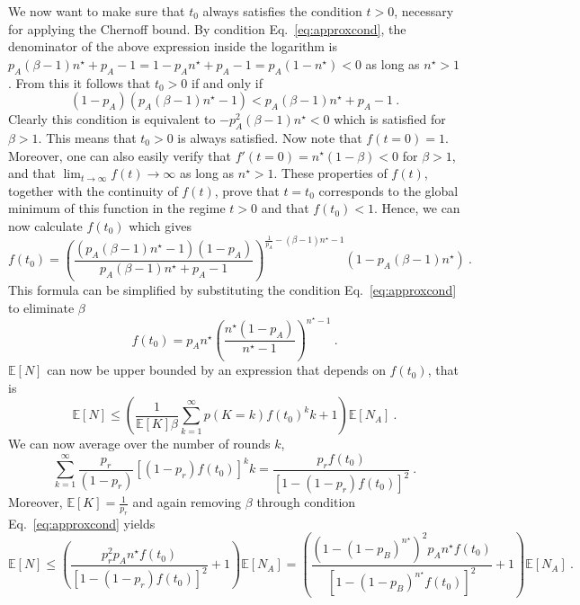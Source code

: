 \documentclass[aps,pra,reprint,superscriptaddress]{revtex4-1}
\newcommand{\nstar}{n^{\star}}
\begin{document}
We now want to make sure that $t_0$ always satisfies the condition $t>0$, necessary for applying the Chernoff bound. By condition Eq.~\eqref{eq:approxcond}, the denominator of the above expression inside the logarithm is $p_A (\beta-1)\nstar + p_A - 1 = 1- p_A\nstar + p_A - 1 = p_A (1-\nstar) <0$ as long as $\nstar >1$. From this it follows that $t_0>0$ if and only if
\begin{equation}
(1-p_A) (p_A (\beta-1)\nstar - 1) < p_A (\beta-1)\nstar + p_A - 1\ .
\end{equation}
Clearly this condition is equivalent to $-p_A^2 (\beta-1)\nstar
<0$ which is satisfied for $\beta>1$. This means that $t_0>0$ is
always satisfied. Now note that $f(t=0) = 1$. Moreover, one can also
easily verify that $f'(t=0) = \nstar (1-\beta) < 0$ for $\beta >1$, and that $\lim_{t \rightarrow \infty} f(t) \rightarrow \infty$ as long as $\nstar>1$. These properties of $f(t)$, together with the continuity of $f(t)$, prove that $t=t_0$ corresponds to the global minimum of this function in the regime $t>0$ and that $f(t_0) <1$. Hence, we can now calculate $f(t_0)$ which gives
\begin{equation}
f(t_0) = \left(\frac{(p_A (\beta-1)\nstar-1)(1-p_A)}{p_A(\beta-1)\nstar+p_A-1}\right)^{\frac{1}{p_A} -  (\beta-1)\nstar - 1} (1 - p_A (\beta-1)\nstar)\ .
\end{equation}
This formula can be simplified by substituting the condition Eq.~\eqref{eq:approxcond} to eliminate $\beta$
\begin{equation}
f(t_0) = p_A \nstar \left(\frac{\nstar (1-p_A)}{\nstar-1}\right)^{\nstar-1}\ .
\label{eq:ft0}
\end{equation}
$\mathbb{E}\left[N\right] $ can now be upper bounded by an expression
that depends on $f(t_0)$, that is
\begin{equation}
\mathbb{E}\left[N\right] \leq \left(\frac{1}{ \mathbb{E}[K] \beta}\sum_{k=1}^\infty p(K=k) f(t_0)^k k +1\right) \mathbb{E}[N_A]\ .
\end{equation}
We can now average over the number of rounds $k$,
\begin{equation}
\sum_{k=1}^\infty \frac{p_r}{(1-p_r)} \left[(1-p_r) f(t_0)\right]^k k = \frac{p_r f(t_0)}{\left[1-(1-p_r) f(t_0)\right]^2}\ .
\end{equation}
Moreover, $ \mathbb{E}[K] = \frac{1}{p_r}$ and again removing $\beta$
through condition Eq.~\eqref{eq:approxcond} yields
\begin{equation}
\mathbb{E}\left[N\right] \leq \left(\frac{p_r^2 p_A \nstar f(t_0)}{\left[1-(1-p_r) f(t_0)\right]^2} +1\right) \mathbb{E}[N_A] = \left(\frac{(1 - (1-p_B)^{\nstar})^2 p_A \nstar f(t_0)}{\left[1-(1-p_B)^{\nstar} f(t_0)\right]^2} +1\right) \mathbb{E}[N_A]\ .
\end{equation}
\end{document}
